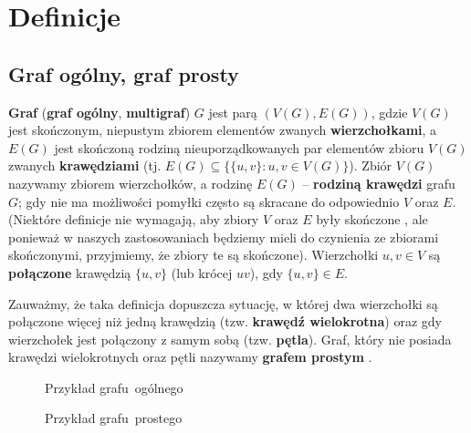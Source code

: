 \section{Definicje}

\subsection*{Graf ogólny, graf prosty}

\textbf{Graf} (\textbf{graf ogólny}, \textbf{multigraf}) $G$ jest parą $(V(G),E(G))$, gdzie $V(G)$ jest skończonym, niepustym zbiorem elementów zwanych \textbf{wierzchołkami}, a $E(G)$ jest skończoną rodziną nieuporządkowanych par elementów zbioru $V(G)$ zwanych \textbf{krawędziami} \cite[20]{wilson} (tj. $E(G) \subseteq \{\{u,v\} : u,v \in V(G)\}$). Zbiór $V(G)$ nazywamy zbiorem wierzchołków, a rodzinę $E(G)$ -- \textbf{rodziną krawędzi} grafu $G$; gdy nie ma możliwości pomyłki często są skracane do odpowiednio $V$ oraz $E$. (Niektóre definicje nie wymagają, aby zbiory $V$ oraz $E$ były skończone \cite[143]{ross}, ale ponieważ w naszych zastosowaniach będziemy mieli do czynienia ze zbiorami skończonymi, przyjmiemy, że zbiory te są skończone).  Wierzchołki $u,v \in V$ są \textbf{połączone} krawędzią $\{u,v\}$ (lub krócej $uv$), gdy $\{u,v\} \in E$. 

Zauważmy, że taka definicja dopuszcza sytuację, w której dwa wierzchołki są połączone więcej niż jedną krawędzią (tzw. \textbf{krawędź wielokrotna}) oraz gdy wierzchołek jest połączony z samym sobą (tzw. \textbf{pętla}). Graf, który nie posiada krawędzi wielokrotnych oraz pętli nazywamy \textbf{grafem prostym} \cite[19]{wilson}.

\begin{figure}[h]
\centering
\begin{minipage}{.45\textwidth}
  \centering
\captionsetup{justification=centering}
\caption{Przykład grafu~ogólnego} \label{fig:simple-graph}
\end{minipage}
\begin{minipage}{.45\textwidth}
  \centering
\captionsetup{justification=centering}
\caption{Przykład grafu~prostego} \label{fig:graph}
\end{minipage}
\end{figure}


